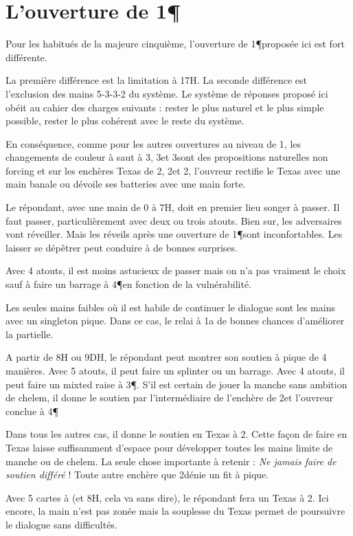 \chapter{ L'ouverture de 1\P}

Pour les habitués de la majeure cinquième, l'ouverture de 1\P proposée ici est fort différente.

La première différence est la limitation à 17H. La seconde différence est l'exclusion des mains 5-3-3-2 du système.
Le système de réponses proposé ici obéit au cahier des charges suivants : rester le plus naturel et le plus simple possible, rester le plus cohérent avec le reste du système.

En conséquence, comme pour les autres ouvertures au niveau de 1, les changements de couleur à saut à 3\T, 3\K et 3\C sont des propositions naturelles non forcing et sur les enchères Texas de 2\T, 2\K et 2\C, l'ouvreur rectifie le Texas avec une main banale ou dévoile ses batteries avec une main forte.

Le répondant, avec une main de 0 à 7H, doit en premier lieu songer à passer.  Il faut passer, particulièrement avec deux ou trois atouts. Bien sur, les adversaires vont réveiller. Mais les réveils après une ouverture de 1\P sont inconfortables. Les laisser se dépêtrer peut conduire à de bonnes surprises.

Avec 4 atouts, il est moins astucieux de passer mais on n'a pas vraiment le choix sauf à faire un barrage à 4\P en fonction de la vulnérabilité.

Les seules mains faibles où il est habile de continuer le dialogue sont les mains avec un singleton pique. Dans ce cas, le relai à 1\NT a de bonnes chances d'améliorer la partielle.

A partir de 8H ou 9DH, le répondant peut montrer son soutien à pique de 4 manières. Avec 5 atouts, il peut faire un splinter ou un barrage. Avec 4 atouts, il peut faire un mixted raise à 3\P. S'il est certain de jouer la manche sans ambition de chelem, il donne le soutien par l'intermédiaire de l'enchère de 2\NT et l'ouvreur conclue à 4\P


Dans tous les autres cas, il donne le soutien en Texas à 2\C. Cette façon de faire en Texas laisse suffisamment d'espace pour développer toutes les mains limite de manche ou de chelem.
La seule chose importante à retenir : \textit{Ne jamais faire de soutien différé} ! Toute autre enchère que 2\C dénie un fit à pique.


Avec 5 cartes à \C (et 8H, cela va sans dire), le répondant fera un Texas à 2\K. Ici encore, la main n'est pas zonée mais la souplesse du Texas permet de poursuivre le dialogue sans difficultés.

